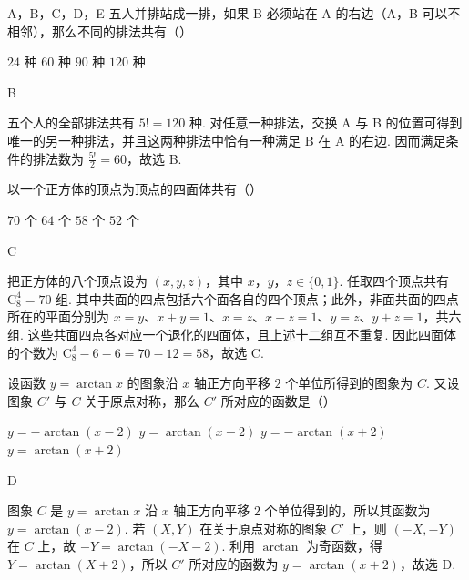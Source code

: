 \begin{problem}
A，B，C，D，E 五人并排站成一排，如果 B 必须站在 A 的右边（A，B 可以不相邻），那么不同的排法共有（\quad）

\choices
    {\(24\text{ 种}\)}
    {\(60\text{ 种}\)}
    {\(90\text{ 种}\)}
    {\(120\text{ 种}\)}

\begin{answer}
B
\end{answer}

\begin{solution}
五个人的全部排法共有 \(5!=120\) 种. 对任意一种排法，交换 A 与 B 的位置可得到唯一的另一种排法，并且这两种排法中恰有一种满足 B 在 A 的右边. 因而满足条件的排法数为 \(\frac{5!}{2}=60\)，故选 B.
\end{solution}
\end{problem}

\begin{problem}
以一个正方体的顶点为顶点的四面体共有（\quad）

\choices
    {\(70\text{ 个}\)}
    {\(64\text{ 个}\)}
    {\(58\text{ 个}\)}
    {\(52\text{ 个}\)}

\begin{answer}
C
\end{answer}

\begin{solution}
把正方体的八个顶点设为 \((x,y,z)\)，其中 \(x\)，\(y\)，\(z\in\{0,1\}\). 任取四个顶点共有 \(\mathrm C_8^4=70\) 组. 其中共面的四点包括六个面各自的四个顶点；此外，非面共面的四点所在的平面分别为 \(x=y\)、\(x+y=1\)、\(x=z\)、\(x+z=1\)、\(y=z\)、\(y+z=1\)，共六组. 这些共面四点各对应一个退化的四面体，且上述十二组互不重复. 因此四面体的个数为 \(\mathrm C_8^4-6-6=70-12=58\)，故选 C.
\end{solution}
\end{problem}

\begin{problem}
设函数 \(y=\arctan x\) 的图象沿 \(x\) 轴正方向平移 \(2\) 个单位所得到的图象为 \(C\). 又设图象 \(C'\) 与 \(C\) 关于原点对称，那么 \(C'\) 所对应的函数是（\quad）

\choices
    {\(y=-\arctan(x-2)\)}
    {\(y=\arctan(x-2)\)}
    {\(y=-\arctan(x+2)\)}
    {\(y=\arctan(x+2)\)}

\begin{answer}
D
\end{answer}

\begin{solution}
图象 \(C\) 是 \(y=\arctan x\) 沿 \(x\) 轴正方向平移 \(2\) 个单位得到的，所以其函数为 \(y=\arctan(x-2)\). 若 \((X,Y)\) 在关于原点对称的图象 \(C'\) 上，则 \((-X,-Y)\) 在 \(C\) 上，故 \(-Y=\arctan(-X-2)\). 利用 \(\arctan\) 为奇函数，得 \(Y=\arctan(X+2)\)，所以 \(C'\) 所对应的函数为 \(y=\arctan(x+2)\)，故选 D.
\end{solution}
\end{problem}

